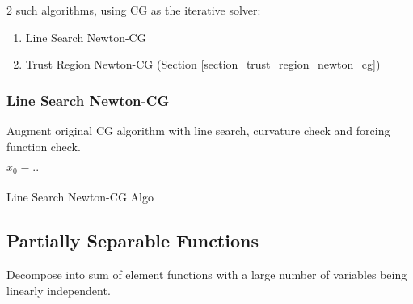 \documentclass[8pt,letter]{article}
\begin{document}
\begin{multicols*}{2}
    2 such algorithms, using CG as the iterative solver:
    \begin{enumerate}
    \item Line Search Newton-CG
    \item Trust Region Newton-CG (Section \ref{section_trust_region_newton_cg})
    \end{enumerate}

    \subsubsection{Line Search Newton-CG}
    Augment original CG algorithm with line search, curvature check and forcing function check.\\
    
    \begin{algorithm}[H]
      $x_0 = ..$\\
      \\
      \caption{Line Search Newton-CG Algo \label{Algo_line_search_newton_cg}}
    \end{algorithm}

    \subsection{Partially Separable Functions}
    Decompose into sum of element functions with a large number of variables being linearly independent.\\


\end{multicols*}
\end{document}
